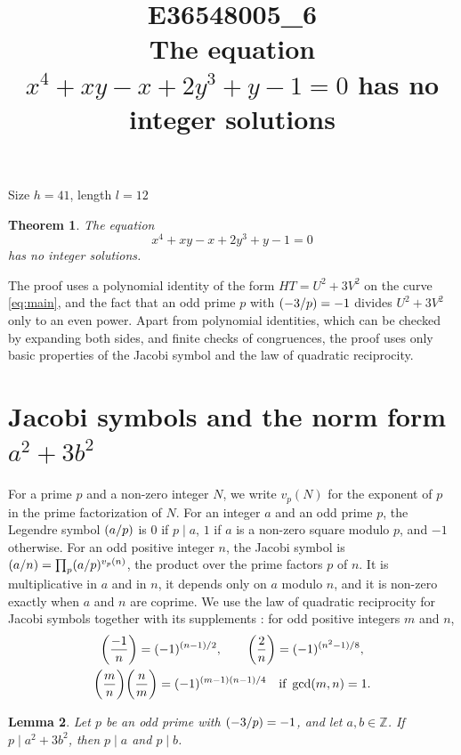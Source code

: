 \documentclass[11pt]{article}
\title{\textbf{E36548005\_6}\\[4pt] {\Large The equation $x^{4}+xy-x+2y^{3}+y-1=0$ has no integer solutions}}
\author{}
\date{}
\newtheorem{theorem}{Theorem}
\newtheorem{lemma}[theorem]{Lemma}
\newcommand{\Z}{\mathbb{Z}}
\newcommand{\leg}[2]{\mathchoice{\biggl(\dfrac{#1}{#2}\biggr)}{(#1/#2)}{(#1/#2)}{(#1/#2)}}
\begin{document}
\maketitle
\vspace{-8ex}
\begin{center}
Size $h=41$, length $l=12$
\end{center}

\begin{theorem}\label{thm:main}
The equation
\begin{equation}\label{eq:main}
x^{4}+xy-x+2y^{3}+y-1=0
\end{equation}
has no integer solutions.
\end{theorem}

The proof uses a polynomial identity of the form $HT=U^2+3V^2$ on the curve \eqref{eq:main}, and the fact that an odd prime $p$ with $\leg{-3}{p}=-1$ divides $U^2+3V^2$ only to an even power. Apart from polynomial identities, which can be checked by expanding both sides, and finite checks of congruences, the proof uses only basic properties of the Jacobi symbol and the law of quadratic reciprocity.

\section{\texorpdfstring{Jacobi symbols and the norm form $a^2+3b^2$}{Jacobi symbols and the norm form}}

For a prime $p$ and a non-zero integer $N$, we write $v_p(N)$ for the exponent of $p$ in the prime factorization of $N$. For an integer $a$ and an odd prime $p$, the Legendre symbol $\leg{a}{p}$ is $0$ if $p\mid a$, $1$ if $a$ is a non-zero square modulo $p$, and $-1$ otherwise. For an odd positive integer $n$, the Jacobi symbol is $\leg{a}{n}=\prod_p\leg{a}{p}^{v_p(n)}$, the product over the prime factors $p$ of $n$. It is multiplicative in $a$ and in $n$, it depends only on $a$ modulo $n$, and it is non-zero exactly when $a$ and $n$ are coprime. We use the law of quadratic reciprocity for Jacobi symbols together with its supplements \cite[Chapter~5, \S2]{IR}: for odd positive integers $m$ and $n$,
\begin{gather*}
\leg{-1}{n}=(-1)^{(n-1)/2},\qquad\leg{2}{n}=(-1)^{(n^2-1)/8},\\
\leg{m}{n}\leg{n}{m}=(-1)^{(m-1)(n-1)/4}\quad\text{if }\gcd(m,n)=1.
\end{gather*}

\begin{lemma}\label{lem:divides}
Let $p$ be an odd prime with $\leg{-3}{p}=-1$, and let $a,b\in\Z$. If $p\mid a^2+3b^2$, then $p\mid a$ and $p\mid b$.
\end{lemma}
\end{document}
